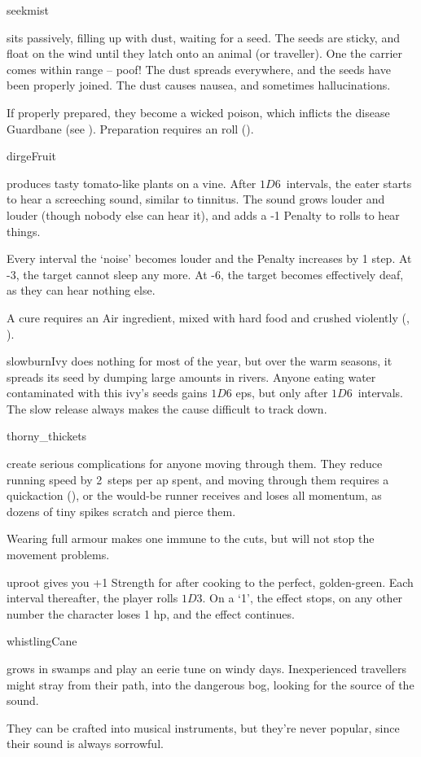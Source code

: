 \begin{multicols}{2}
%
  {seekmist}%
  {sits passively, filling up with dust, waiting for a seed.
  The seeds are sticky, and float on the wind until they latch onto an animal (or traveller).
  One the carrier comes within range -- poof!
  The dust spreads everywhere, and the seeds have been properly joined.
  The dust causes nausea, and sometimes hallucinations.

  If properly prepared, they become a wicked poison, which inflicts the disease Guardbane (see ).
  Preparation requires an  roll (\tn[12]).
    }


%
  {dirgeFruit}%
  {produces tasty tomato-like plants on a vine.
    After $1D6$~\glspl{interval}, the eater starts to hear a screeching sound, similar to tinnitus.
    The sound grows louder and louder (though nobody else can hear it), and adds a -1 Penalty to rolls to hear things.

    Every \gls{interval} the `noise' becomes louder and the Penalty increases by 1 step.
    At -3, the target cannot sleep any more.
    At -6, the target becomes effectively deaf, as they can hear nothing else.

    A cure requires an Air \gls{ingredient}, mixed with hard food and crushed violently (, \tn[10]).}%

%
  {slowburnIvy}%
  {does nothing for most of the year, but over the warm seasons, it spreads its seed by dumping large amounts in rivers.
  Anyone eating water contaminated with this ivy's seeds gains $1D6$ \glspl{ep}, but only after $1D6$~\glspl{interval}.
  The slow release always makes the cause difficult to track down.
    }

%
  {thorny_thickets}%
  {create serious complications for anyone moving through them.
    They reduce running speed by 2~\glspl{step} per \gls{ap} spent, and moving through them requires a  \gls{quickaction} (\tn[10]), or the would-be runner receives  and loses all momentum, as dozens of tiny spikes scratch and pierce them.

    Wearing full armour makes one immune to the cuts, but will not stop the movement problems.}%

%
  {uproot}%
  {gives you +1 Strength for  after cooking to the perfect, golden-green.
  Each \gls{interval} thereafter, the player rolls $1D3$.
  On a `1', the effect stops, on any other number the character loses 1 \gls{hp}, and the effect continues.}

%
  {whistlingCane}%
  {grows in swamps and play an eerie tune on windy days.
  Inexperienced travellers might stray from their path, into the dangerous bog, looking for the source of the sound.

  They can be crafted into musical instruments, but they're never popular, since their sound is always sorrowful.}

\end{multicols}

